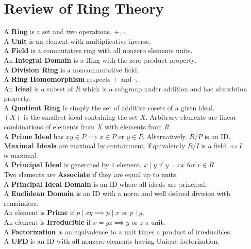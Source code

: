\section{Review of Ring Theory}

\begin{definition}[Rings]
	A \textbf{Ring} is a set and two operations, \(+, \cdot\).\\
	A \textbf{Unit} is an element with multiplicative inverse.\\
	A \textbf{Field} is a commutative ring with all nonzero elements units.\\
	An \textbf{Integral Domain} is a Ring with the zero product property.\\
	A \textbf{Division Ring} is a noncommutative field.\\
	A \textbf{Ring Homomorphism} respects \(+\) and \(\cdot\).\\
	An \textbf{Ideal} is a subset of \(R\) which is a subgroup under addition and has absorbtion property.\\
	A \textbf{Quotient Ring} Is simply the set of additive cosets of a given ideal.\\
	\(\left( X \right) \) is the smallest ideal containing the set \(X\). Arbitrary elements are linear combinations of elements from \(X\) with elements from \(R\).\\
	A \textbf{Prime Ideal} has \(xy \in P \implies x \in P \text{ or } y \in P\). Alternatively, \(R / P\) is an ID.\\
	\textbf{Maximal Ideals} are maximal by containment. Equivalently \(R / I\) is a field \(\iff I\)  is maximal.\\
	A \textbf{Principal Ideal} is generated by \(1\) element.
	\(x \mid y\) if \(y = rx\) for \(r \in R\).\\
	Two elements are \textbf{Associate} if they are equal up to units.\\
	A \textbf{Principal Ideal Domain} is an ID where all ideals are principal.\\
	A \textbf{Euclidean Domain} is an ID with a norm and well defined division with remainders.\\
	An element is \textbf{Prime} if \(p \mid xy \implies p \mid x \text{ or } p \mid y\).\\
	An element is \textbf{Irreducible} if \(x = yz \implies y\) or \(z\) a unit.\\
	A \textbf{Factorization} is an equivalence to a unit times a product of irreducibles.\\
	A \textbf{UFD} is an ID with all nonzero elements having Unique factorization.\\
\end{definition}
